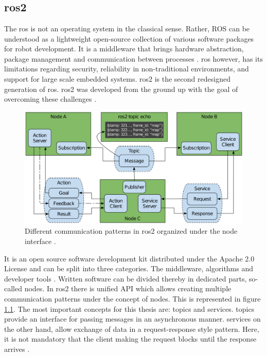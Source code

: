 \chapter{}
\label{sec:background}

\section{\gls{ros2}}
The \gls{ros} is not an operating system in the classical sense. Rather, ROS can be understood as a lightweight open-source collection of various software packages for robot development. It is a middleware that brings hardware abstraction, package management and communication between processes \cite{quigley_ros_nodate, noauthor_ros_nodate}.\newline
\gls{ros} however, has its limitations regarding security, reliability in non-traditional environments, and support for large scale embedded systems. \gls{ros2} is the second redesigned generation of \gls{ros}. \gls{ros2} was developed from the ground up with the goal of overcoming these challenges \cite{rico_concise_2022, macenski_robot_2022, liao_introduction_2020}.
\begin{figure}[htbp]
	\centering
	\includegraphics[width=1\textwidth]{Figures/c3/ros2_node_interfaces.png}
	\caption{Different communication patterns in \gls{ros2} organized under the \gls{node} interface \cite{macenski_robot_2022}.}
	\label{c3_fig_ros2_node_interfaces}
\end{figure}
It is an open source software development kit distributed under the Apache 2.0 License and can be split into three categories. The middleware, algorithms and developer tools \cite{macenski_robot_2022}. 
Written software can be divided thereby in dedicated parts, so-called \glspl{node}. In \gls{ros2} there is unified API which allows creating multiple communication patterns under the concept of \glspl{node}. This is represented in figure \ref{c3_fig_ros2_node_interfaces}. The most important concepts for this thesis are: \glspl{topic} and \glspl{service}. \Glspl{topic} provide an interface for passing \glspl{message} in an asynchronous manner. \Glspl{service} on the other hand, allow exchange of data in a request-response style pattern. Here, it is not mandatory that the client making the request blocks until the response arrives \cite{rico_concise_2022, macenski_robot_2022}.\newline
